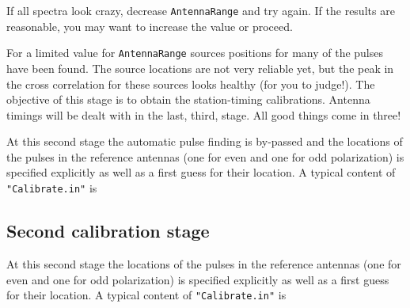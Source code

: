 If all spectra look crazy, decrease \verb!AntennaRange! and try again. If the results are reasonable, you may want to increase the value or proceed.

For a limited value for \verb!AntennaRange! sources positions for many of the pulses have been found. The source locations are not very reliable yet, but the peak in the cross correlation for these sources looks healthy (for you to judge!). The objective of this stage is to obtain the station-timing calibrations. Antenna timings will be dealt with in the last, third, stage. All good things come in three!

At this second stage the automatic pulse finding is by-passed and the locations of the pulses in the reference antennas (one for even and one for odd polarization) is specified explicitly as well as a first guess for their location. A typical content of \verb!"Calibrate.in"! is

\subsection{Second calibration stage}

At this second stage the locations of the pulses in the reference antennas (one for even and one for odd polarization) is specified explicitly as well as a first guess for their location. A typical content of \verb!"Calibrate.in"! is

